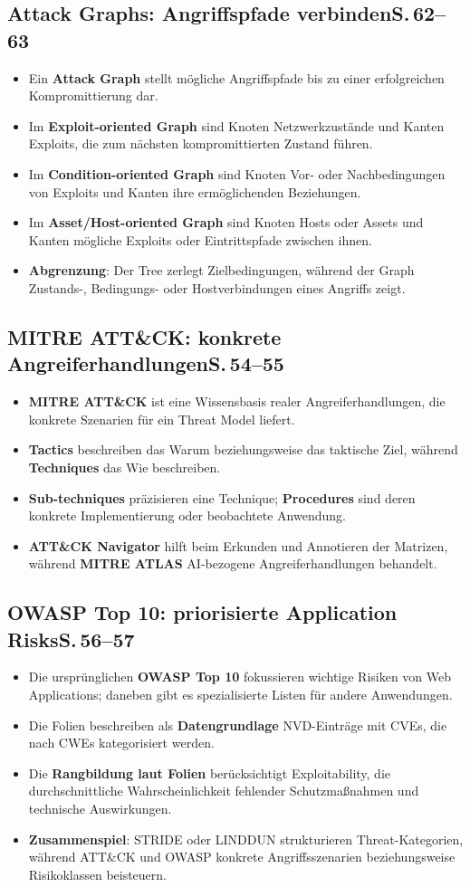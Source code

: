 \documentclass[11pt,a4paper]{article}
\newcommand{\block}[2]{\subsection*{#1\hfill{\normalfont\small #2}}}
\begin{document}
\block{Attack Graphs: Angriffspfade verbinden}{S.\,62--63}
\begin{itemize}
\item Ein \textbf{Attack Graph} stellt mögliche Angriffspfade bis zu einer erfolgreichen Kompromittierung dar.
\item Im \textbf{Exploit-oriented Graph} sind Knoten Netzwerkzustände und Kanten Exploits, die zum nächsten kompromittierten Zustand führen.
\item Im \textbf{Condition-oriented Graph} sind Knoten Vor- oder Nachbedingungen von Exploits und Kanten ihre ermöglichenden Beziehungen.
\item Im \textbf{Asset/Host-oriented Graph} sind Knoten Hosts oder Assets und Kanten mögliche Exploits oder Eintrittspfade zwischen ihnen.
\item \textbf{Abgrenzung}: Der Tree zerlegt Zielbedingungen, während der Graph Zustands-, Bedingungs- oder Hostverbindungen eines Angriffs zeigt.
\end{itemize}

\block{MITRE ATT\&CK: konkrete Angreiferhandlungen}{S.\,54--55}
\begin{itemize}
\item \textbf{MITRE ATT\&CK} ist eine Wissensbasis realer Angreiferhandlungen, die konkrete Szenarien für ein Threat Model liefert.
\item \textbf{Tactics} beschreiben das Warum beziehungsweise das taktische Ziel, während \textbf{Techniques} das Wie beschreiben.
\item \textbf{Sub-techniques} präzisieren eine Technique; \textbf{Procedures} sind deren konkrete Implementierung oder beobachtete Anwendung.
\item \textbf{ATT\&CK Navigator} hilft beim Erkunden und Annotieren der Matrizen, während \textbf{MITRE ATLAS} AI-bezogene Angreiferhandlungen behandelt.
\end{itemize}

\block{OWASP Top 10: priorisierte Application Risks}{S.\,56--57}
\begin{itemize}
\item Die ursprünglichen \textbf{OWASP Top 10} fokussieren wichtige Risiken von Web Applications; daneben gibt es spezialisierte Listen für andere Anwendungen.
\item Die Folien beschreiben als \textbf{Datengrundlage} NVD-Einträge mit CVEs, die nach CWEs kategorisiert werden.
\item Die \textbf{Rangbildung laut Folien} berücksichtigt Exploitability, die durchschnittliche Wahrscheinlichkeit fehlender Schutzmaßnahmen und technische Auswirkungen.
\item \textbf{Zusammenspiel}: STRIDE oder LINDDUN strukturieren Threat-Kategorien, während ATT\&CK und OWASP konkrete Angriffsszenarien beziehungsweise Risikoklassen beisteuern.
\end{itemize}
\end{document}
